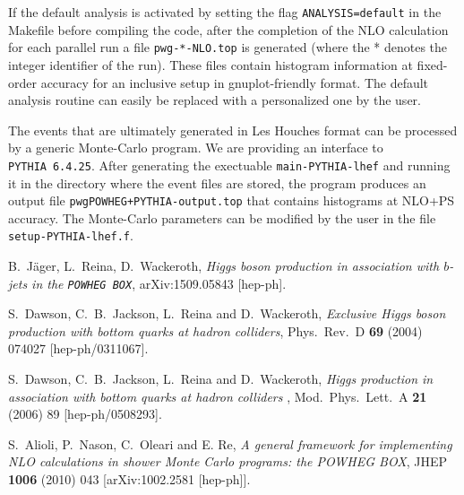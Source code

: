 \documentclass[a4paper,11pt]{article}
\newcommand\POWHEGBOX{{\tt POWHEG BOX}}
\newcommand\PYTHIA{{\tt PYTHIA}}
\begin{document}
If the default analysis is activated by setting the flag 
{\tt ANALYSIS=default} in the Makefile before compiling the code, after the completion of the NLO calculation for each parallel run a file {\tt  pwg-*-NLO.top} is generated (where the * denotes the integer
identifier of the run). These files contain histogram information at fixed-order accuracy for an inclusive setup in gnuplot-friendly format. The default analysis routine can easily be replaced with a personalized one by the user.  

The events that are ultimately generated in Les Houches format can be processed by a generic Monte-Carlo program. We are providing an interface to \PYTHIA~{\tt 6.4.25}. After generating the exectuable {\tt main-PYTHIA-lhef} and running it in the directory where the event files are stored, the program produces an output file {\tt pwgPOWHEG+PYTHIA-output.top} that contains histograms at NLO+PS accuracy. The Monte-Carlo parameters can be modified by the user in the file {\tt setup-PYTHIA-lhef.f}. 

%
\begin{thebibliography}{99}

 B.~J\"ager, L.~Reina, D.~Wackeroth, {\em Higgs boson production in association with $b$-jets in the  \POWHEGBOX{}}, arXiv:1509.05843 [hep-ph]. 

  S.~Dawson, C.~B.~Jackson, L.~Reina and D.~Wackeroth,
  {\em Exclusive Higgs boson production with bottom quarks at hadron colliders},
  Phys.\ Rev.\ D {\bf 69} (2004) 074027
  [hep-ph/0311067].

  S.~Dawson, C.~B.~Jackson, L.~Reina and D.~Wackeroth,
  {\em Higgs production in association with bottom quarks at hadron colliders} ,
  Mod.\ Phys.\ Lett.\ A {\bf 21} (2006) 89
  [hep-ph/0508293].

 S.~Alioli, P.~Nason, C.~Oleari and E. Re, {\em
    A general framework for implementing NLO calculations in shower
    Monte Carlo programs: the POWHEG BOX}, JHEP {\bf 1006} (2010)
  043  [arXiv:1002.2581 [hep-ph]].

\end{thebibliography}
\end{document}

